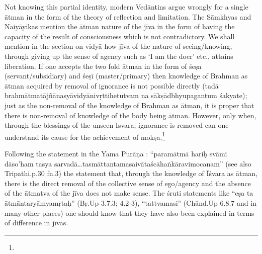Not knowing this partial identity, modern Vedāntins argue wrongly for a single ātman in the form of the theory of reflection and limitation. The Sāmkhyas and Naiyāyikas mention the ātman nature of the jīva in the form of having the capacity of the result of consciousness which is not contradictory. We shall mention in the section on vidyā how jīva of the nature of seeing/knowing, through giving up the sense of agency such as ‘I am the doer’ etc., attains liberation. If one accepts the two fold ātman in the form of śeṣa (servant/subsidiary) and śeṣī (master/primary) then knowledge of Brahman as ātman acquired by removal of ignorance is not possible directly (tadā brahmātmatājñānasyāvidyānivṛttihetutvam na sākṣādbhyupagantum śakyate); just as the non-removal of the knowledge of Brahman as ātman, it is proper that there is non-removal of knowledge of the body being ātman. However, only when, through the blessings of the unseen Īsvara, ignorance is removed can one understand its cause for the achievement of mokṣa.\footnote{} 

Following the statement in the Yama Purāṇa : “paramātmā hariḥ svāmī dāso’ham tasya sarvadā…tasmāttantamasaivātaścāhaṅkāravimoca\-nam” (see also Tripathi.p.30 fn.3) the statement that, through the knowledge of Īśvara as ātman, there is the direct removal of the collective sense of ego/agency and the absence of the ātmatva of the jīva does not make sense. The śruti statements like “eṣa ta ātmāntaryāmyamṛtaḥ” (Bṛ.Up 3.7.3; 4.2-3), “tattvamasi” (Chānd.Up 6.8.7 and in many other places) one should know that they have also been explained in terms of difference in jīvas.



